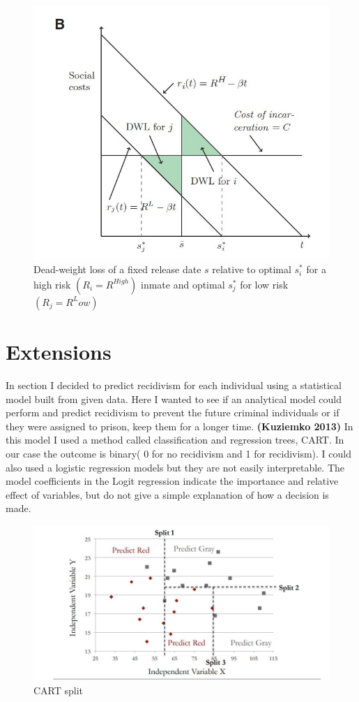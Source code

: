 \documentclass[a4paper,12pt]{article}
\begin{document}
\begin{figure}[h]
\centering
\includegraphics[scale=0.60]{fig2.JPG}
\caption{Dead-weight loss of a fixed release date $s$ relative to optimal $s^*_i$ for a high risk $(R_i = R^{High})$ inmate and optimal $s^*_j$ for low risk $(R_j = R^Low)$}
\label{fig:Figure 2}
\end{figure}

\newpage
\section{Extensions}
In section I decided to predict recidivism for each individual using a statistical model built from given data. Here I wanted to see if an analytical model could perform and predict recidivism to prevent the future criminal individuals or if they were assigned to prison, keep them for a longer time. \textbf{(Kuziemko 2013)}\cite{Kuziemko2013} In this model I used a method called classification and regression trees, CART. In our case the outcome is binary( 0 for no recidivism and 1 for recidivism). I could also used a logistic regression models but they are not easily interpretable. The model coefficients in the Logit regression indicate the importance and relative effect of variables, but do not give a simple explanation of how a decision is made. 


\begin{figure}[h]
\centering
\includegraphics[scale=0.60]{CART.JPG}
\caption{CART split}
\label{fig:Figure 1}
\end{figure}
\end{document}
